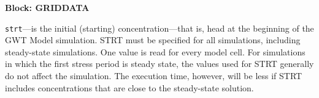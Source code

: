 
\item \textbf{Block: GRIDDATA}

\begin{description}
\item \texttt{strt}---is the initial (starting) concentration---that is, head at the beginning of the GWT Model simulation.  STRT must be specified for all simulations, including steady-state simulations. One value is read for every model cell. For simulations in which the first stress period is steady state, the values used for STRT generally do not affect the simulation. The execution time, however, will be less if STRT includes concentrations that are close to the steady-state solution.

\end{description}

